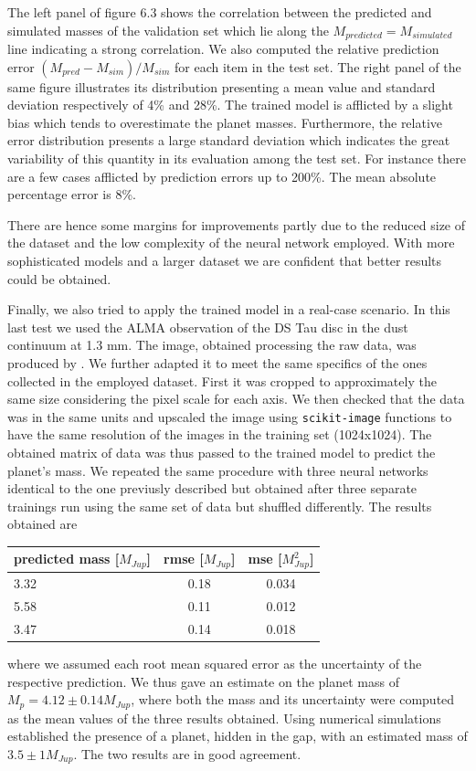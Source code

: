 \documentclass[a4paper,10pt]{report}
\begin{document}
The left panel of figure 6.3 shows the correlation between the predicted and simulated masses of the validation set which
lie along the $M_{predicted} = M_{simulated}$ line indicating a strong correlation.
We also computed the relative prediction error $(M_{pred} - M_{sim})/M_{sim}$ for each item
in the test set. The right panel of the same figure illustrates its distribution
presenting a mean value and standard deviation respectively of 4\% and 28\%.
The trained model is afflicted by a slight bias which tends to overestimate the planet masses.
Furthermore, the relative error distribution presents a large standard deviation which indicates the great
variability of this quantity in its evaluation among the test set. For instance there are a few cases afflicted by
prediction errors up to 200\%. The mean absolute percentage error is 8\%.

There are hence some margins for improvements partly due to the reduced size of
the dataset and the low complexity of the neural network employed. With more sophisticated models and
a larger dataset we are confident that better results could be obtained.

Finally, we also tried to apply the trained model in a real-case scenario. In this last test we used
the ALMA observation of the DS Tau disc in the dust continuum at 1.3 mm.
The image, obtained processing the raw data, was produced by \citet{Long_2018}.
We further adapted it to meet the same specifics of the ones collected in the employed dataset.
First it was cropped to
approximately the same size considering the pixel scale for each axis.
We then checked that the data was in the same units and upscaled the image using
\lstinline{scikit-image} functions to have the same resolution of the images in the training set (1024x1024).
The obtained matrix of data was thus passed to the trained model to predict the planet's mass.
We repeated the same procedure with three neural networks identical to the one previusly described but 
obtained after three separate trainings run using the same set of data but shuffled differently. The results obtained are
\begin{center}
    \begin{tabular}{lcc}
        \toprule
        predicted mass [$M_{Jup}$] & rmse [$M_{Jup}$] & mse [$M^2_{Jup}$] \\
        \midrule
        3.32 & 0.18 & 0.034 \\
        5.58 & 0.11 & 0.012 \\
        3.47 & 0.14 & 0.018 \\
        \bottomrule        
    \end{tabular}
\end{center}
where we assumed each root mean squared error as the uncertainty of the respective prediction. 
We thus gave an estimate on the planet mass of $M_p = 4.12 \pm 0.14 M_{Jup}$, where both the mass and its uncertainty were computed as the mean values
of the three results obtained.
Using numerical simulations \citet{dstauv} established the presence of a planet, hidden in the gap, with an estimated
mass of $3.5 \pm 1 M_{Jup}$. The two results are in good agreement.
\end{document}

